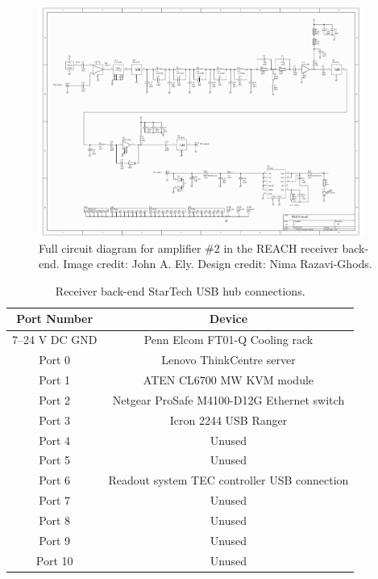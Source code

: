 \begin{figure}
    \centering
    \includegraphics[angle=90,width=0.95\textwidth]{amp2_schematic}
    \caption{Full circuit diagram for amplifier \#2 in the REACH receiver back-end. Image credit: John A. Ely. Design credit: Nima Razavi-Ghods.}
    \label{fig:amp2_schematic}
\end{figure}

\begin{table}
    \begin{center}
    \begin{tabular}{ |c|c| }
    \hline
    Port Number & Device \\
    \hline
    7--24 V DC GND & Penn Elcom FT01-Q Cooling rack\\
    Port 0 & Lenovo ThinkCentre server \\
    Port 1 & ATEN CL6700 MW KVM module \\
    Port 2 & Netgear ProSafe M4100-D12G Ethernet switch \\
    Port 3 & Icron 2244 USB Ranger \\
    Port 4 & Unused \\
    Port 5 & Unused \\
    Port 6 & Readout system TEC controller USB connection \\
    Port 7 & Unused \\
    Port 8 & Unused \\
    Port 9 & Unused \\
    Port 10 & Unused \\
    \hline
    \end{tabular}
    \caption{Receiver back-end StarTech USB hub connections.}
    \label{tab:usb_hub}
    \end{center}
\end{table}

